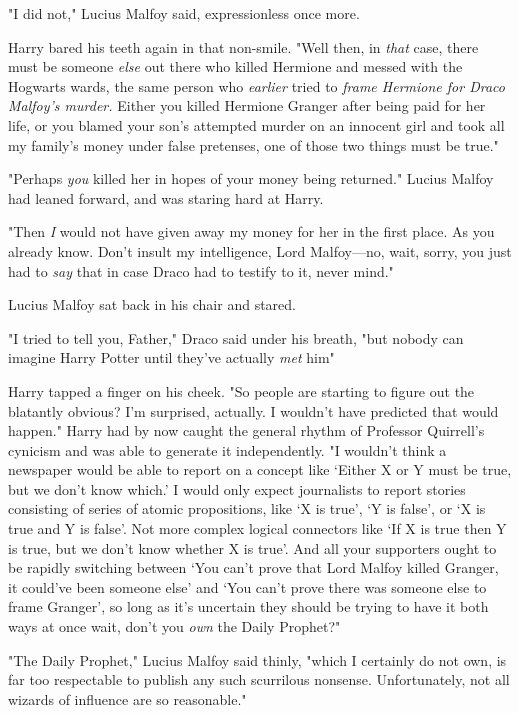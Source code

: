"I did not," Lucius Malfoy said, expressionless once more.

Harry bared his teeth again in that non-smile. "Well then, in \emph{that} case,
there must be someone \emph{else} out there who killed Hermione and messed with
the Hogwarts wards, the same person who \emph{earlier} tried to \emph{frame
Hermione for Draco Malfoy's murder.} Either you killed Hermione Granger after
being paid for her life, or you blamed your son's attempted murder on an
innocent girl and took all my family's money under false pretenses, one of
those two things must be true."

"Perhaps \emph{you} killed her in hopes of your money being returned." Lucius
Malfoy had leaned forward, and was staring hard at Harry.

"Then \emph{I} would not have given away my money for her in the first place.
As you already know. Don't insult my intelligence, Lord Malfoy---no, wait,
sorry, you just had to \emph{say} that in case Draco had to testify to it,
never mind."

Lucius Malfoy sat back in his chair and stared.

"I tried to tell you, Father," Draco said under his breath, "but nobody can
imagine Harry Potter until they've actually \emph{met} him{\el}"

Harry tapped a finger on his cheek. "So people are starting to figure out the
blatantly obvious? I'm surprised, actually. I wouldn't have predicted that
would happen." Harry had by now caught the general rhythm of Professor
Quirrell's cynicism and was able to generate it independently. "I wouldn't
think a newspaper would be able to report on a concept like `Either X or Y must
be true, but we don't know which.' I would only expect journalists to report
stories consisting of series of atomic propositions, like `X is true', `Y is
false', or `X is true and Y is false'. Not more complex logical connectors like
`If X is true then Y is true, but we don't know whether X is true'. And all
your supporters ought to be rapidly switching between `You can't prove that
Lord Malfoy killed Granger, it could've been someone else' and `You can't prove
there was someone else to frame Granger', so long as it's uncertain they should
be trying to have it both ways at once{\el} wait, don't you \emph{own} the
Daily Prophet?"

"The Daily Prophet," Lucius Malfoy said thinly, "which I certainly do not own,
is far too respectable to publish any such scurrilous nonsense. Unfortunately,
not all wizards of influence are so reasonable."

